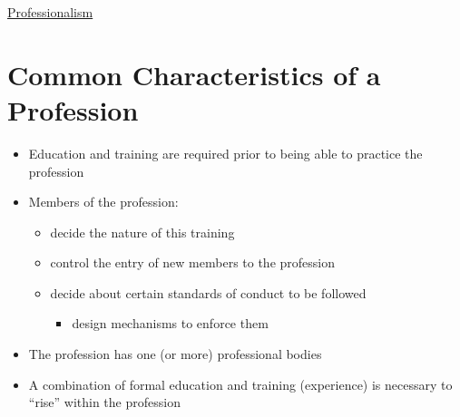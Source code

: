 \documentclass{article}
\begin{document}
\begin{center}
	\underline{\huge Professionalism}
\end{center}






\section{Common Characteristics of a Profession}
\begin{itemize}
\item Education and training are required prior to being able to practice the profession
\item Members of the profession:
\begin{itemize}
\item decide the nature of this training
\item control the entry of new members to the profession
\item decide about certain standards of conduct to be followed
\begin{itemize}
\item design mechanisms to enforce them
\end{itemize}
\end{itemize}
\item The profession has one (or more) professional bodies
\item A combination of formal education and training (experience) is necessary to ``rise'' within the profession
\end{itemize}
\end{document}
